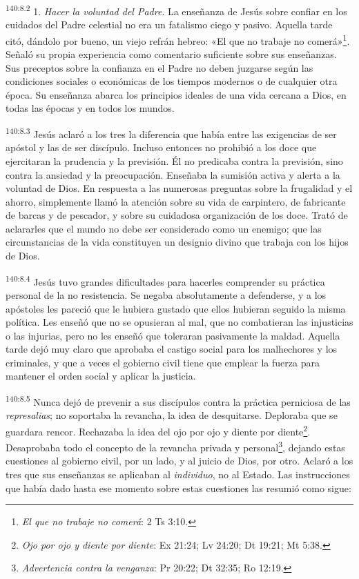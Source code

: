 \par 
\textsuperscript{140:8.2} 1. \textit{Hacer la voluntad del Padre}. La enseñanza de Jesús sobre confiar en los cuidados del Padre celestial no era un fatalismo ciego y pasivo. Aquella tarde citó, dándolo por bueno, un viejo refrán hebreo: «El que no trabaje no comerá»\footnote{\textit{El que no trabaje no comerá}: 2 Ts 3:10.}. Señaló su propia experiencia como comentario suficiente sobre sus enseñanzas. Sus preceptos sobre la confianza en el Padre no deben juzgarse según las condiciones sociales o económicas de los tiempos modernos o de cualquier otra época. Su enseñanza abarca los principios ideales de una vida cercana a Dios, en todas las épocas y en todos los mundos.

\par 
\textsuperscript{140:8.3} Jesús aclaró a los tres la diferencia que había entre las exigencias de ser apóstol y las de ser discípulo. Incluso entonces no prohibió a los doce que ejercitaran la prudencia y la previsión. Él no predicaba contra la previsión, sino contra la ansiedad y la preocupación. Enseñaba la sumisión activa y alerta a la voluntad de Dios. En respuesta a las numerosas preguntas sobre la frugalidad y el ahorro, simplemente llamó la atención sobre su vida de carpintero, de fabricante de barcas y de pescador, y sobre su cuidadosa organización de los doce. Trató de aclararles que el mundo no debe ser considerado como un enemigo; que las circunstancias de la vida constituyen un designio divino que trabaja con los hijos de Dios.

\par 
\textsuperscript{140:8.4} Jesús tuvo grandes dificultades para hacerles comprender su práctica personal de la no resistencia. Se negaba absolutamente a defenderse, y a los apóstoles les pareció que le hubiera gustado que ellos hubieran seguido la misma política. Les enseñó que no se opusieran al mal, que no combatieran las injusticias o las injurias, pero no les enseñó que toleraran pasivamente la maldad. Aquella tarde dejó muy claro que aprobaba el castigo social para los malhechores y los criminales, y que a veces el gobierno civil tiene que emplear la fuerza para mantener el orden social y aplicar la justicia.

\par 
\textsuperscript{140:8.5} Nunca dejó de prevenir a sus discípulos contra la práctica perniciosa de las \textit{represalias}; no soportaba la revancha, la idea de desquitarse. Deploraba que se guardara rencor. Rechazaba la idea del ojo por ojo y diente por diente\footnote{\textit{Ojo por ojo y diente por diente}: Ex 21:24; Lv 24:20; Dt 19:21; Mt 5:38.}. Desaprobaba todo el concepto de la revancha privada y personal\footnote{\textit{Advertencia contra la venganza}: Pr 20:22; Dt 32:35; Ro 12:19.}, dejando estas cuestiones al gobierno civil, por un lado, y al juicio de Dios, por otro. Aclaró a los tres que sus enseñanzas se aplicaban al \textit{individuo}, no al Estado. Las instrucciones que había dado hasta ese momento sobre estas cuestiones las resumió como sigue:

